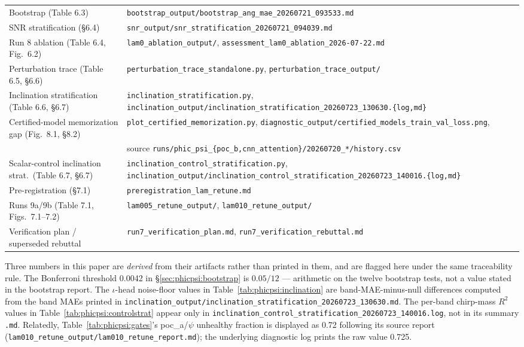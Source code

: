 \documentclass[11pt]{article}
\begin{document}
\begin{table}[tbp]
{\begin{tabular}{@{}ll@{}}
        Bootstrap (Table 6.3)                              & \texttt{bootstrap\_output/bootstrap\_ang\_mae\_20260721\_093533.md} \\
        SNR stratification (\S6.4)                         & \texttt{snr\_output/snr\_stratification\_20260721\_094039.md} \\
        Run 8 ablation (Table 6.4, Fig.~6.2)               & \texttt{lam0\_ablation\_output/}, \texttt{assessment\_lam0\_ablation\_2026-07-22.md} \\
        Perturbation trace (Table 6.5, \S6.6)              & \texttt{perturbation\_trace\_standalone.py}, \texttt{perturbation\_trace\_output/} \\
        Inclination stratification (Table 6.6, \S6.7)      & \texttt{inclination\_stratification.py}, \texttt{inclination\_output/inclination\_stratification\_20260723\_130630.\{log,md\}} \\
        Certified-model memorization gap (Fig.~8.1, \S8.2) & \texttt{plot\_certified\_memorization.py}, \texttt{diagnostic\_output/certified\_models\_train\_val\_loss.png}, \\
                                                           & \quad source \texttt{runs/phic\_psi\_\{poc\_b,cnn\_attention\}/20260720\_*/history.csv} \\
        Scalar-control inclination strat.\ (Table 6.7, \S6.7) & \texttt{inclination\_control\_stratification.py}, \texttt{inclination\_output/inclination\_control\_stratification\_20260723\_140016.\{log,md\}} \\
        Pre-registration (\S7.1)                           & \texttt{preregistration\_lam\_retune.md} \\
        Runs 9a/9b (Table 7.1, Figs.~7.1--7.2)             & \texttt{lam005\_retune\_output/}, \texttt{lam010\_retune\_output/} \\
        Verification plan / superseded rebuttal            & \texttt{run7\_verification\_plan.md}, \texttt{run7\_verification\_rebuttal.md} \\
        \bottomrule
    \end{tabular}
    }
\end{table}

Three numbers in this paper are \emph{derived} from their artifacts rather than printed in them, and are flagged here under the same traceability rule.
The Bonferroni threshold 0.0042 in \S\ref{sec:phicpsi:bootstrap} is $0.05/12$ --- arithmetic on the twelve bootstrap tests, not a value stated in the bootstrap report.
The $\iota$-head noise-floor values in Table~\ref{tab:phicpsi:inclination} are band-MAE-minus-null differences computed from the band MAEs printed in \texttt{inclination\_output/inclination\_stratification\_20260723\_130630.md}.
The per-band chirp-mass $R^2$ values in Table~\ref{tab:phicpsi:controlstrat} appear only in \texttt{inclination\_control\_stratification\_20260723\_140016.log}, not in its summary \texttt{.md}.
Relatedly, Table~\ref{tab:phicpsi:gates}'s poc\_a/$\psi$ unhealthy fraction is displayed as 0.72 following its source report (\texttt{lam010\_retune\_output/lam010\_retune\_report.md}); the underlying diagnostic log prints the raw value 0.725.



\end{document}
